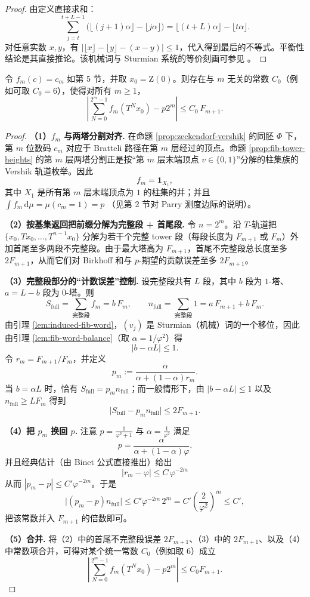 \begin{proof}
由定义直接求和：
$$
\sum_{j=t}^{t+L-1}\big(\lfloor (j+1)\alpha\rfloor-\lfloor j\alpha\rfloor\big)=\lfloor (t+L)\alpha\rfloor-\lfloor t\alpha\rfloor.
$$
对任意实数 $x,y$，有 $\big|\lfloor x\rfloor-\lfloor y\rfloor-(x-y)\big|\le 1$，代入得到最后的不等式。平衡性结论是其直接推论。该机械词与 Sturmian 系统的等价刻画可参见 \cite{lothaire2002acow}。
\end{proof}

\begin{proposition}[两塔分解给出的显式偏差界]\label{prop:tower-explicit-discrepancy}
令 $f_m(c)=c_m$ 如第 5 节，并取 $x_0=\mathrm{Z}(0)$。则存在与 $m$ 无关的常数 $C_0$（例如可取 $C_0=6$），使得对所有 $m\ge 1$，
$$
\left|\sum_{N=0}^{2^m-1} f_m(T^N x_0)-p2^m\right|\le C_0\,F_{m+1}.
$$
\end{proposition}

\begin{proof}
\textbf{（1）$f_m$ 与两塔分割对齐.}
在命题 \ref{prop:zeckendorf-vershik} 的同胚 $\Phi$ 下，第 $m$ 位数码 $c_m$ 对应于 Bratteli 路径在第 $m$ 层经过的顶点。命题 \ref{prop:fib-tower-heights} 的第 $m$ 层两塔分割正是按“第 $m$ 层末端顶点 $v\in\{0,1\}$”分解的柱集族的 Vershik 轨道枚举。因此
$$
f_m=\mathbf{1}_{X_1},
$$
其中 $X_1$ 是所有第 $m$ 层末端顶点为 $1$ 的柱集的并；并且
$
\int f_m\,\mathrm{d}\mu=\mu(c_m=1)=p
$
（见第 2 节对 Parry 测度边际的说明）。

\textbf{（2）按基集返回把前缀分解为完整段 + 首尾段.}
令 $n=2^m$。沿 $T$-轨道把 $\{x_0,Tx_0,\dots,T^{n-1}x_0\}$ 分解为若干个完整 tower 段（每段长度为 $F_{m+1}$ 或 $F_m$）外加首尾至多两段不完整段。由于最大塔高为 $F_{m+1}$，首尾不完整段总长度至多 $2F_{m+1}$，从而它们对 Birkhoff 和与 $p$-期望的贡献误差至多 $2F_{m+1}$。

\textbf{（3）完整段部分的“计数误差”控制.}
设完整段共有 $L$ 段，其中 $b$ 段为 $1$-塔、$a=L-b$ 段为 $0$-塔。则
$$
S_{\mathrm{full}}=\sum_{\text{完整段}} f_m = b\,F_m,\qquad
n_{\mathrm{full}}=\sum_{\text{完整段}} 1 = a\,F_{m+1}+b\,F_m.
$$
由引理 \ref{lem:induced-fib-word}，$(v_j)$ 是 Sturmian（机械）词的一个移位，因此由引理 \ref{lem:fib-word-balance}（取 $\alpha=1/\varphi^2$）得
$$
\big|b-\alpha L\big|\le 1.
$$
令 $r_m=F_{m+1}/F_m$，并定义
$$
p_m:=\frac{\alpha}{\alpha+(1-\alpha)r_m}.
$$
当 $b=\alpha L$ 时，恰有 $S_{\mathrm{full}}=p_m n_{\mathrm{full}}$；而一般情形下，由 $|b-\alpha L|\le 1$ 以及 $n_{\mathrm{full}}\ge L F_m$ 得到
$$
\big|S_{\mathrm{full}}-p_m n_{\mathrm{full}}\big|\le 2F_{m+1}.
$$

\textbf{（4）把 $p_m$ 换回 $p$.}
注意 $p=\frac{1}{\varphi^2+1}$ 与 $\alpha=\frac{1}{\varphi^2}$ 满足
$$
p=\frac{\alpha}{\alpha+(1-\alpha)\varphi}.
$$
并且经典估计（由 Binet 公式直接推出）给出
$$
\left|r_m-\varphi\right|\le C\,\varphi^{-2m}
$$
从而 $|p_m-p|\le C'\varphi^{-2m}$。于是
$$
\big|(p_m-p)n_{\mathrm{full}}\big|
\le C' \varphi^{-2m}\,2^m
=C'\left(\frac{2}{\varphi^2}\right)^m
\le C',
$$
把该常数并入 $F_{m+1}$ 的倍数即可。

\textbf{（5）合并.}
将（2）中的首尾不完整段误差 $2F_{m+1}$、（3）中的 $2F_{m+1}$、以及（4）中常数项合并，可得对某个统一常数 $C_0$（例如取 $6$）成立
$$
\left|\sum_{N=0}^{2^m-1} f_m(T^N x_0)-p2^m\right|\le C_0F_{m+1}.
$$
\end{proof}

